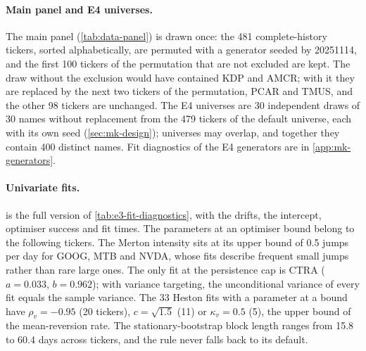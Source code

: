 \paragraph{Main panel and E4 universes.}
The main panel (\cref{tab:data-panel}) is drawn once: the 481 complete-history tickers, sorted
alphabetically, are permuted with a generator seeded by 20251114, and the first 100 tickers of
the permutation that are not excluded are kept. The draw without the exclusion would have
contained KDP and AMCR; with it they are replaced by the next two tickers of the permutation,
PCAR and TMUS, and the other 98 tickers are unchanged. The E4 universes are 30 independent
draws of 30 names without replacement from the 479 tickers of the default universe, each with
its own seed (\cref{sec:mk-design}); universes may overlap, and together they contain 400
distinct names. Fit diagnostics of the E4 generators are in \cref{app:mk-generators}.

\begin{table}[tbp]
  \centering
  \caption{The 100 tickers of the main panel (E1, E3, E5).}
  \label{tab:data-panel}
  \small
\end{table}

\paragraph{Univariate fits.}
 is the full version of \cref{tab:e3-fit-diagnostics}, with
the drifts, the \GARCHt{} intercept, optimiser success and fit times. The parameters at an
optimiser bound belong to the following tickers. The Merton intensity sits at its upper bound
of 0.5 jumps per day for GOOG, MTB and NVDA, whose fits describe frequent small jumps rather than
rare large ones. The only \GARCHt{} fit at the persistence cap is CTRA ($a=0.033$, $b=0.962$);
with variance targeting, the unconditional variance of every \GARCHt{} fit equals the \TRAIN{}
sample variance. The 33 Heston fits with a parameter at a bound have $\rho_v=-0.95$ (20
tickers), $c=\sqrt{1.5}$ (11) or $\kappa_v=0.5$ (5), the upper bound of the mean-reversion rate.
The stationary-bootstrap block length ranges from 15.8 to 60.4 days across tickers, and the
rule never falls back to its default.

